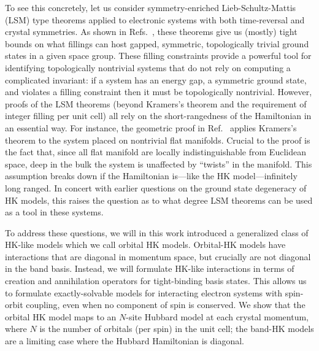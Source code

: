 \documentclass[prb,aps,amssymb,twocolumn,notitlepage]{revtex4-2}
\begin{document}
To see this concretely, let us consider symmetry-enriched Lieb-Schultz-Mattis (LSM) type theorems applied to electronic systems with both time-reversal and crystal symmetries.
As shown in Refs.~\cite{watanabe2015filling,LIEB1961407,hastings2004lieb,oshikawa2000commensurability,parameswaran2013topological}, these theorems give us (mostly) tight bounds on what fillings can host gapped, symmetric, topologically trivial ground states in a given space group. 
These filling constraints provide a powerful tool for identifying topologically nontrivial systems that do not rely on computing a complicated invariant: if a system has an energy gap, a symmetric ground state, and violates a filling constraint then it must be topologically nontrivial. 
However, proofs of the LSM theorems (beyond Kramers's theorem and the requirement of integer filling per unit cell) all rely on the short-rangedness of the Hamiltonian in an essential way. 
For instance, the geometric proof in Ref.~\cite{watanabe2015filling} applies Kramers's theorem to the system placed on nontrivial flat manifolds. 
Crucial to the proof is the fact that, since all flat manifold are locally indistinguishable from Euclidean space, deep in the bulk the system is unaffected by ``twists'' in the manifold. 
This assumption breaks down if the Hamiltonian is---like the HK model---infinitely long ranged. 
In concert with earlier questions on the ground state degeneracy of HK models, this raises the question as to what degree LSM theorems can be used as a tool in these systems.

To address these questions, we will in this work introduced a generalized class of HK-like models which we call orbital HK models. 
Orbital-HK models have interactions that are diagonal in momentum space, but crucially are not diagonal in the band basis. 
Instead, we will formulate HK-like interactions in terms of creation and annihilation operators for tight-binding basis states. 
This allows us to formulate exactly-solvable models for interacting electron systems with spin-orbit coupling, even when no component of spin is conserved. 
We show that the orbital HK model maps to an $N$-site Hubbard model at each crystal momentum, where $N$ is the number of orbitals (per spin) in the unit cell; the band-HK models are a limiting case where the Hubbard Hamiltonian is diagonal. 
\end{document}
